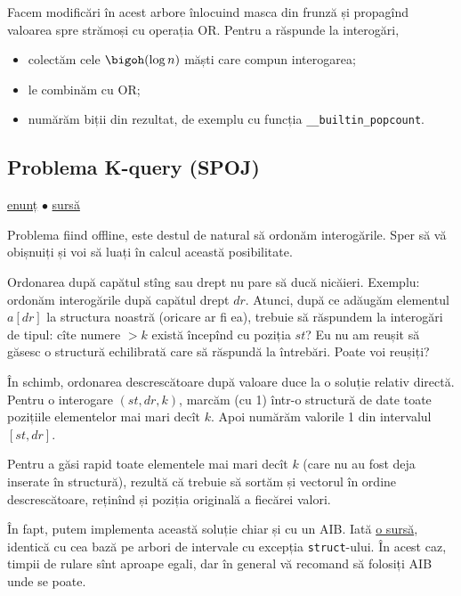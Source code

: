Facem modificări în acest arbore înlocuind masca din frunză și propagînd valoarea spre strămoși cu operația OR. Pentru a răspunde la interogări,

\begin{itemize}
  \item colectăm cele $\bigoh(\log n)$ măști care compun interogarea;
  \item le combinăm cu OR;
  \item numărăm biții din rezultat, de exemplu cu funcția \texttt{__builtin_popcount}.
\end{itemize}

\subsection{Problema K-query (SPOJ)}

\href{https://www.spoj.com/problems/KQUERY/}{enunț}
$\bullet$
\href{https://github.com/CatalinFrancu/nerdvana/blob/main/problems/spoj/kquery/cata-segtree-decreasing-k.cpp}{sursă}

Problema fiind offline, este destul de natural să ordonăm interogările. Sper să vă obișnuiți și voi să luați în calcul această posibilitate.

Ordonarea după capătul stîng sau drept nu pare să ducă nicăieri. Exemplu: ordonăm interogările după capătul drept $dr$. Atunci, după ce adăugăm elementul $a[dr]$ la structura noastră (oricare ar fi ea), trebuie să răspundem la interogări de tipul: cîte numere $> k$ există începînd cu poziția $st$? Eu nu am reușit să găsesc o structură echilibrată care să răspundă la întrebări. Poate voi reușiți?

În schimb, ordonarea descrescătoare după valoare duce la o soluție relativ directă. Pentru o interogare $(st, dr, k)$, marcăm (cu 1) într-o structură de date toate pozițiile elementelor mai mari decît $k$. Apoi numărăm valorile 1 din intervalul $[st, dr]$.

Pentru a găsi rapid toate elementele mai mari decît $k$ (care nu au fost deja inserate în structură), rezultă că trebuie să sortăm și vectorul în ordine descrescătoare, reținînd și poziția originală a fiecărei valori.

În fapt, putem implementa această soluție chiar și cu un AIB. Iată \href{https://github.com/CatalinFrancu/nerdvana/blob/main/problems/spoj/kquery/cata-fenwick-decreasing-k.cpp}{o sursă}, identică cu cea bază pe arbori de intervale cu excepția \texttt{struct}-ului. În acest caz, timpii de rulare sînt aproape egali, dar în general vă recomand să folosiți AIB unde se poate.

